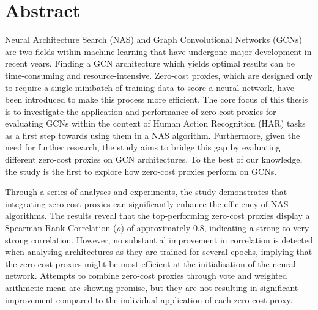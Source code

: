 \setcounter{page}{1}
\chapter*{Abstract}

Neural Architecture Search (NAS) and Graph Convolutional Networks (GCNs) are two fields within machine learning that have undergone major development in recent years. Finding a GCN architecture which yields optimal results can be time-consuming and resource-intensive. Zero-cost proxies, which are designed only to require a single minibatch of training data to score a neural network, have been introduced to make this process more efficient. The core focus of this thesis is to investigate the application and performance of zero-cost proxies for evaluating GCNs within the context of Human Action Recognition (HAR) tasks as a first step towards using them in a NAS algorithm. Furthermore, given the need for further research, the study aims to bridge this gap by evaluating different zero-cost proxies on GCN architectures. To the best of our knowledge, the study is the first to explore how zero-cost proxies perform on GCNs. 
    
Through a series of analyses and experiments, the study demonstrates that integrating zero-cost proxies can significantly enhance the efficiency of NAS algorithms. The results reveal that the top-performing zero-cost proxies display a Spearman Rank Correlation ($\rho$) of approximately $0.8$, indicating a strong to very strong correlation. However, no substantial improvement in correlation is detected when analysing architectures as they are trained for several epochs, implying that the zero-cost proxies might be most efficient at the initialisation of the neural network. Attempts to combine zero-cost proxies through vote and weighted arithmetic mean are showing promise, but they are not resulting in significant improvement compared to the individual application of each zero-cost proxy. 